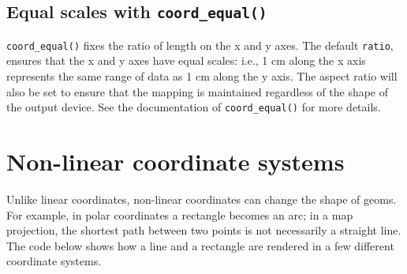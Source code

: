 \subsection{\texorpdfstring{Equal scales with
\texttt{coord\_equal()}}{Equal scales with coord\_equal()}}

\texttt{coord\_equal()} fixes the ratio of length on the x and y axes.
The default \texttt{ratio}, ensures that the x and y axes have equal
scales: i.e., 1 cm along the x axis represents the same range of data as
1 cm along the y axis. The aspect ratio will also be set to ensure that
the mapping is maintained regardless of the shape of the output device.
See the documentation of \texttt{coord\_equal()} for more details.
 

\section{Non-linear coordinate systems}\label{sub:coord-non-linear}

Unlike linear coordinates, non-linear coordinates can change the shape
of geoms. For example, in polar coordinates a rectangle becomes an arc;
in a map projection, the shortest path between two points is not
necessarily a straight line. The code below shows how a line and a
rectangle are rendered in a few different coordinate systems.

\begin{Shaded}
\begin{Highlighting}[]
\StringTok{ }\NormalTok{(} \NormalTok{, } \NormalTok{)}
\StringTok{ }\NormalTok{(} \NormalTok{(}\NormalTok{, }\NormalTok{), } \NormalTok{(}\NormalTok{, }\NormalTok{))}
\StringTok{ }\NormalTok{(} \StringTok{ }
\StringTok{  }\NormalTok{(} \NormalTok{(} \NormalTok{, } \NormalTok{)) +}\StringTok{ }
\StringTok{  }\NormalTok{(} \StringTok{ }
\StringTok{  }\NormalTok{(}\NormalTok{) +}\StringTok{ }\NormalTok{(}\NormalTok{)}
\StringTok{ }\NormalTok{(}\NormalTok{)}
\StringTok{ }\NormalTok{(}\NormalTok{)}
\end{Highlighting}
\end{Shaded}

